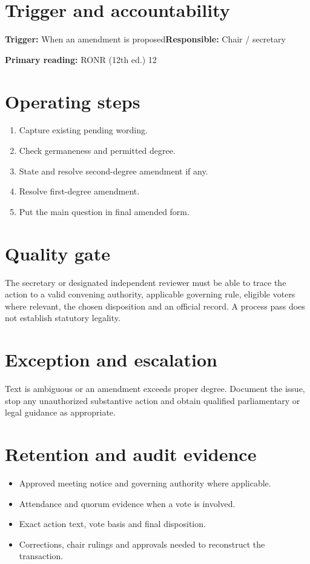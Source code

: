 \documentclass[11pt]{article}
\begin{document}
\SuiteOpen
{}
\section{Trigger and accountability}
\textbf{Trigger:} When an amendment is proposed\quad\textbf{Responsible:} Chair / secretary

\textbf{Primary reading:} RONR (12th ed.) 12

\section{Operating steps}
\begin{enumerate}[leftmargin=*,itemsep=4pt]
\item Capture existing pending wording.
\item Check germaneness and permitted degree.
\item State and resolve second-degree amendment if any.
\item Resolve first-degree amendment.
\item Put the main question in final amended form.
\end{enumerate}

\section{Quality gate}
The secretary or designated independent reviewer must be able to trace the action to a valid convening authority, applicable governing rule, eligible voters where relevant, the chosen disposition and an official record. A process pass does not establish statutory legality.

\section{Exception and escalation}
Text is ambiguous or an amendment exceeds proper degree. Document the issue, stop any unauthorized substantive action and obtain qualified parliamentary or legal guidance as appropriate.

\section{Retention and audit evidence}
\begin{itemize}[leftmargin=*,itemsep=4pt]
\item Approved meeting notice and governing authority where applicable.
\item Attendance and quorum evidence when a vote is involved.
\item Exact action text, vote basis and final disposition.
\item Corrections, chair rulings and approvals needed to reconstruct the transaction.
\end{itemize}
\end{document}
